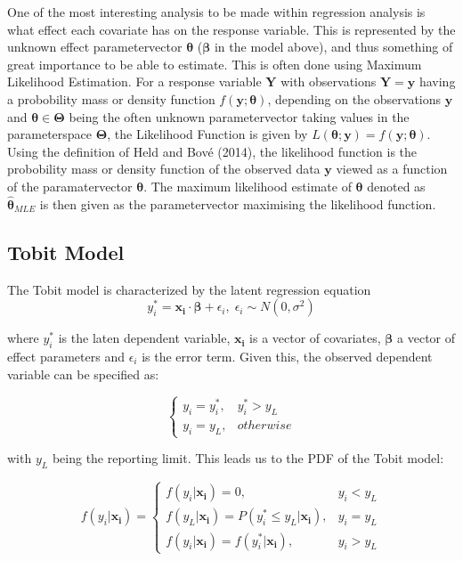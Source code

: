 \documentclass[]{article}
\begin{document}
One of the most interesting analysis to be made within regression
analysis is what effect each covariate has on the response variable.
This is represented by the unknown effect parametervector
\(\mathbf{\theta}\) (\(\mathbf{\beta}\) in the model above), and thus
something of great importance to be able to estimate. This is often done
using Maximum Likelihood Estimation. For a response variable
\(\mathbf{Y}\) with observations \(\mathbf{Y} = \mathbf{y}\) having a
probobility mass or density function \(f(\mathbf{y};\mathbf{\theta})\),
depending on the observations \(\mathbf{y}\) and
\(\mathbf{\theta} \in \mathbf{\Theta}\) being the often unknown
parametervector taking values in the parameterspace \(\mathbf{\Theta}\),
the Likelihood Function is given by
\(L(\mathbf{\theta;\mathbf{y}}) = f(\mathbf{y};\mathbf{\theta})\). Using
the definition of Held and Bové (2014), the likelihood function is the
probobility mass or density function of the observed data \(\mathbf{y}\)
viewed as a function of the paramatervector \(\mathbf{\theta}\). The
maximum likelihood estimate of \(\mathbf{\theta}\) denoted as
\(\mathbf{\hat{\theta}}_{MLE}\) is then given as the parametervector
maximising the likelihood function.

\subsection{Tobit Model}\label{tobit-model}

The Tobit model is characterized by the latent regression equation \[
y_i^* = \mathbf{x_i}\cdot\mathbf{\beta} + \epsilon_i, \; \epsilon_i \sim N(0, \sigma^2)
\]

where \(y_i^*\) is the laten dependent variable, \(\mathbf{x_i}\) is a
vector of covariates, \(\mathbf{\beta}\) a vector of effect parameters
and \(\epsilon_i\) is the error term. Given this, the observed dependent
variable can be specified as:

\[
\begin{cases}
y_i = y_i^*, & y_i^* > y_L \\
y_i = y_L, & otherwise
\end{cases}
\]

with \(y_L\) being the reporting limit. This leads us to the PDF of the
Tobit model:

\[
f(y_i|\mathbf{x_i}) = \begin{cases}
f(y_i|\mathbf{x_i}) = 0, & y_i<y_L\\
f(y_L|\mathbf{x_i}) = P(y_i^* \leq y_L|\mathbf{x_i}), & y_i=y_L\\
 f(y_i|\mathbf{x_i})=f(y_i^*|\mathbf{x_i}), & y_i>y_L
\end{cases}
\]
\end{document}
